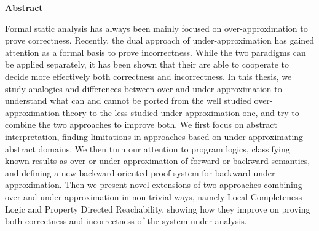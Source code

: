 \thispagestyle{plain}
\begin{center}
	\Large
	\textbf{Abstract}
\end{center}
Formal static analysis has always been mainly focused on over-approximation to prove correctness. Recently, the dual approach of under-approximation has gained attention as a formal basis to prove incorrectness. While the two paradigms can be applied separately, it has been shown that their are able to cooperate to decide more effectively both correctness and incorrectness.
In this thesis, we study analogies and differences between over and under-approximation to understand what can and cannot be ported from the well studied over-approximation theory to the less studied under-approximation one, and try to combine the two approaches to improve both.
We first focus on abstract interpretation, finding limitations in approaches based on under-approximating abstract domains. We then turn our attention to program logics, classifying known results as over or under-approximation of forward or backward semantics, and defining a new backward-oriented proof system for backward under-approximation. Then we present novel extensions of two approaches combining over and under-approximation in non-trivial ways, namely Local Completeness Logic and Property Directed Reachability, showing how they improve on proving both correctness and incorrectness of the system under analysis.
